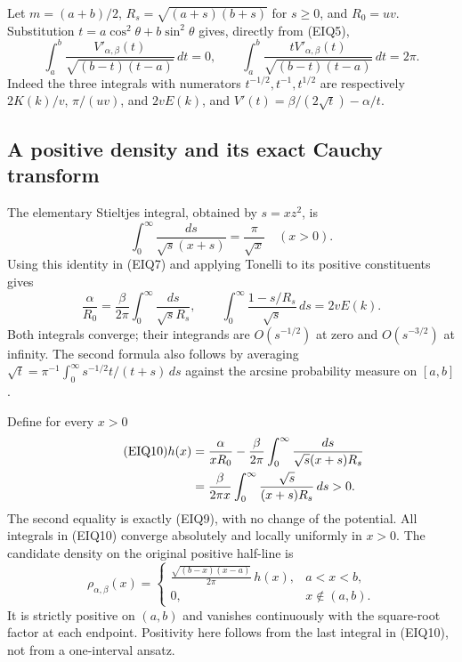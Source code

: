 \documentclass[11pt,a4paper]{article}
\begin{document}
Let $m=(a+b)/2$, $R_s=\sqrt{(a+s)(b+s)}$ for $s\geq0$, and
$R_0=uv$.  Substitution
$t=a\cos^2\theta+b\sin^2\theta$ gives, directly from (EIQ5),
\begin{equation}\tag{EIQ7}
 \int_a^b\frac{V'_{\alpha,\beta}(t)}
                  {\sqrt{(b-t)(t-a)}}\,dt=0,
 \qquad
 \int_a^b\frac{tV'_{\alpha,\beta}(t)}
                  {\sqrt{(b-t)(t-a)}}\,dt=2\pi.
\end{equation}
Indeed the three integrals with numerators $t^{-1/2},t^{-1},t^{1/2}$
are respectively $2K(k)/v$, $\pi/(uv)$, and $2vE(k)$, and
$V'(t)=\beta/(2\sqrt t)-\alpha/t$.

\subsection{A positive density and its exact Cauchy transform}
The elementary Stieltjes integral, obtained by $s=xz^2$, is
\begin{equation}\tag{EIQ8}
 \int_0^\infty\frac{ds}{\sqrt s(x+s)}=\frac\pi{\sqrt x}
 \quad(x>0).
\end{equation}
Using this identity in (EIQ7) and applying Tonelli to its positive
constituents gives
\begin{equation}\tag{EIQ9}
 \frac\alpha{R_0}=
 \frac\beta{2\pi}\int_0^\infty\frac{ds}{\sqrt s R_s},
 \qquad
 \int_0^\infty\frac{1-s/R_s}{\sqrt s}\,ds=2vE(k).
\end{equation}
Both integrals converge; their integrands are $O(s^{-1/2})$ at zero
and $O(s^{-3/2})$ at infinity.  The second formula also follows by
averaging $\sqrt t=\pi^{-1}\int_0^\infty
s^{-1/2}t/(t+s)\,ds$ against the arcsine probability measure on $[a,b]$.

Define for every $x>0$
\begin{align}\tag{EIQ10}
 h(x)
 &=\frac\alpha{xR_0}
   -\frac\beta{2\pi}
       \int_0^\infty\frac{ds}{\sqrt s(x+s)R_s} \\
 &=\frac\beta{2\pi x}
       \int_0^\infty\frac{\sqrt s}{(x+s)R_s}\,ds>0.\notag
\end{align}
The second equality is exactly (EIQ9), with no change of the potential.
All integrals in (EIQ10) converge absolutely and locally uniformly in
$x>0$.  The candidate density on the original positive half-line is
\begin{equation}\tag{EIQ11}
 \rho_{\alpha,\beta}(x)=
 \begin{cases}
 \displaystyle
 \frac{\sqrt{(b-x)(x-a)}}{2\pi}\,h(x),&a<x<b,\\
 0,&x\notin(a,b).
 \end{cases}
\end{equation}
It is strictly positive on $(a,b)$ and vanishes continuously with the
square-root factor at each endpoint.  Positivity here follows from the
last integral in (EIQ10), not from a one-interval ansatz.
\end{document}
